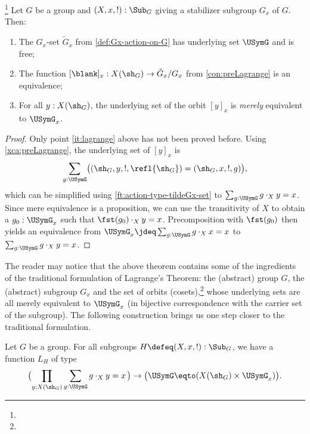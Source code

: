 \begin{theorem}\label{thm:summary5.4}
\footnote{} 
  Let $G$ be a group and $(X,x,!):\Sub_G$ giving a 
  stabilizer subgroup $G_x$ of $G$. Then:
  \begin{enumerate}
  \item The $G_x$-set $\tilde G_x$ from \cref{def:Gx-action-on-G}
  has underlying set $\USymG$ and is free; 
  \item
  The function $[\blank]_x : X(\sh_G)\to\tilde G_x /G_x$
  from \cref{con:preLagrange} is an equivalence;
  \item\label{it:lagrange}
  For all $y:X(\sh_G)$, the underlying set of the orbit $[y]_x$ 
  is \emph{merely} equivalent to $\USymG_x$.
  \end{enumerate}
\end{theorem}

\begin{proof}
Only point \ref{it:lagrange} above has not been proved before.
Using \cref{xca:preLagrange}, the underlying set of $[y]_x$ is 
\[
\sum_{g:\USymG}\bigl((\sh_G,y,!,\refl{\sh_G})=(\sh_G,x,!,g)\bigr),
\]
which can be simplified using \cref{ft:action-type-tildeGx-set} to
$\sum_{g:\USymG} g\cdot_X y = x$. 
Since mere equivalence is a proposition,
we can use the transitivity of $X$ to obtain a $g_0:\USymG_x$ such that
$\fst(g_0)\cdot_X y = x$. Precomposition with $\fst(g_0)$ then yields
an equivalence from $\USymG_x \jdeq \sum_{g:\USymG} g\cdot_X x = x$
to $\sum_{g:\USymG} g\cdot_X y = x$.
\end{proof}

The reader may notice that the above theorem contains some of
the ingredients of the traditional formulation of Lagrange's Theorem:
the (abstract) group $G$, the (abstract) subgroup $G_x$
and the set of orbits (cosets),\footnote{%
} 
whose underlying sets are all merely equivalent to $\USymG_x$
(in bijective correspondence with the carrier set of the subgroup).
The following construction brings us one step closer to the
traditional formulation.

\begin{construction}\label{con:lagrange}
Let $G$ be a group. For all subgroups $H\defeq(X,x,!):\Sub_G$,
we have a function $L_H$ of type
\[
\bigl(\prod_{y:X(\sh_G)}\sum_{g:\USymG} g\cdot_X y = x \,\bigr) \to
\bigl(\USymG \eqto (X(\sh_G) \times \USymG_x)\bigr).
\]
\end{construction}


